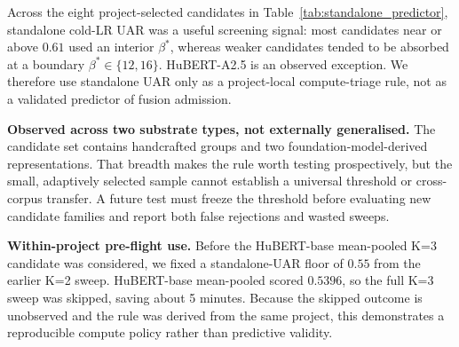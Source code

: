Across the eight project-selected candidates in Table~\ref{tab:standalone_predictor}, standalone cold-LR UAR was a useful screening signal: most candidates near or above $0.61$ used an interior $\beta^*$, whereas weaker candidates tended to be absorbed at a boundary $\beta^* \in \{12,16\}$. HuBERT-A2.5 is an observed exception. We therefore use standalone UAR only as a project-local compute-triage rule, not as a validated predictor of fusion admission.

\textbf{Observed across two substrate types, not externally generalised.} The candidate set contains handcrafted groups and two foundation-model-derived representations. That breadth makes the rule worth testing prospectively, but the small, adaptively selected sample cannot establish a universal threshold or cross-corpus transfer. A future test must freeze the threshold before evaluating new candidate families and report both false rejections and wasted sweeps.

\textbf{Within-project pre-flight use.} Before the HuBERT-base mean-pooled K=3 candidate was considered, we fixed a standalone-UAR floor of $0.55$ from the earlier K=2 sweep. HuBERT-base mean-pooled scored $0.5396$, so the full K=3 sweep was skipped, saving about 5 minutes. Because the skipped outcome is unobserved and the rule was derived from the same project, this demonstrates a reproducible compute policy rather than predictive validity.

